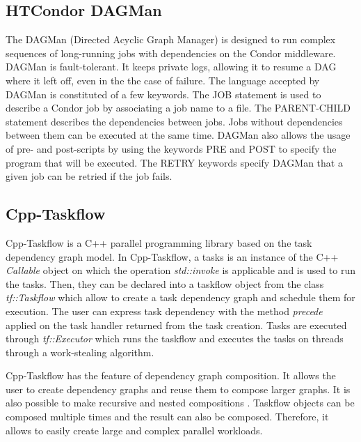 \subsection{HTCondor DAGMan}
The DAGMan (Directed Acyclic Graph Manager) \cite{ThaTL2005} is designed to run complex sequences of long-running jobs with dependencies on the Condor \cite{ThaTL2002} \cite{CKRWW2007} middleware.
DAGMan is fault-tolerant.
It keeps private logs, allowing it to resume a DAG where it left off, even in the the case of failure.
The language accepted by DAGMan is constituted of a few keywords.
The JOB statement is used to describe a Condor job by associating a job name to a file.
The PARENT-CHILD statement describes the dependencies between jobs.
Jobs without dependencies between them can be executed at the same time.
DAGMan also allows the usage of pre- and post-scripts by using the keywords PRE and POST to specify the program that will be executed.
The RETRY keywords specify DAGMan that a given job can be retried if the job fails.

\subsection{Cpp-Taskflow}
Cpp-Taskflow \cite{LiHGW2019a} \cite{HuLGW2019} is a C++ parallel programming library based on the task dependency graph model.
In Cpp-Taskflow, a tasks is an instance of the C++ \textit{Callable} object on which the operation \textit{std::invoke} is applicable and is used to run the tasks.
Then, they can be declared into a taskflow object from the class \textit{tf::Taskflow} which allow to create a task dependency graph and schedule them for execution.
The user can express task dependency with the method \textit{precede} applied on the task handler returned from the task creation.
Tasks are executed through \textit{tf::Executor} which runs the taskflow and executes the tasks on threads through a work-stealing algorithm.

Cpp-Taskflow has the feature of dependency graph composition.
It allows the user to create dependency graphs and reuse them to compose larger graphs.
It is also possible to make recursive and nested compositions \cite{LiHGW2019b}.
Taskflow objects can be composed multiple times and the result can also be composed.
Therefore, it allows to easily create large and complex parallel workloads.

